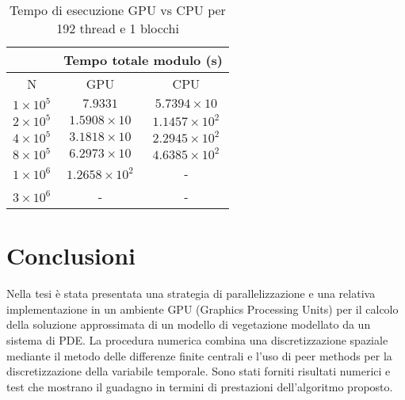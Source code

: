 \begin{table}[ht!]
    \begin{center}
        \renewcommand{\arraystretch}{1.5}
        \begin{adjustbox}{width=.45\textwidth}
            \begin{tabular}{ |c|c|c| }
                \hline
                \multicolumn{1}{|c}{} & \multicolumn{2}{|c|}{Tempo totale modulo (s)} \\
                \hline
                 N & GPU & CPU \\
                 \hline 
                 $1 \times 10^5$ & $7.9331$ & $5.7394 \times 10$ \\
                 \hline 
                 $2 \times 10^5$ & $1.5908 \times 10$ & $1.1457 \times 10^{2}$ \\
                 \hline 
                 $4 \times 10^5$ & $3.1818 \times 10$ & $2.2945 \times 10^{2}$ \\
                 \hline 
                 $8 \times 10^5$ & $6.2973 \times 10$ & $4.6385 \times 10^{2}$ \\
                 \hline 
                 $1 \times 10^6$ & $1.2658 \times 10^{2}$ & - \\
                 \hline 
                 $3 \times 10^6$ & - & - \\
                 \hline 
            \end{tabular}
        \end{adjustbox}
    \end{center}
    \caption{Tempo di esecuzione GPU vs CPU per 192 thread e 1 blocchi}
    \label{tab:time_table_192x1}
\end{table}

\section{Conclusioni} \label{sec:conclusions}
\noindent Nella tesi è stata presentata una strategia di parallelizzazione e una relativa implementazione in un ambiente GPU (Graphics Processing Units) per il calcolo della soluzione approssimata di un modello di vegetazione modellato da un sistema di PDE. La procedura numerica combina una discretizzazione spaziale mediante il metodo delle differenze finite centrali e l'uso di peer methods per la discretizzazione della variabile temporale. Sono stati forniti risultati numerici e test che mostrano il guadagno in termini di prestazioni dell'algoritmo proposto.